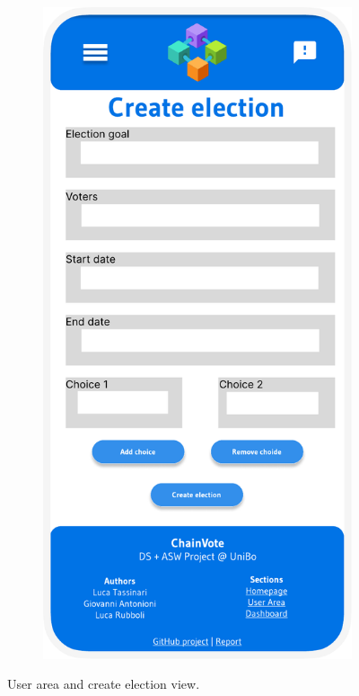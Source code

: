 \documentclass{scrartcl}
\begin{document}
\begin{figure}
\begin{subfigure}[b]{0.3\textwidth}
    \end{subfigure}
    \hfill
    \begin{subfigure}[b]{0.3\textwidth}
        \centering
        \includegraphics[width=\textwidth]{./figures/mockups/create-election.pdf}
    \end{subfigure}
    \caption{User area and create election view.}
    \label{fig:create-election-user-areaview}
\end{figure}
\end{document}

